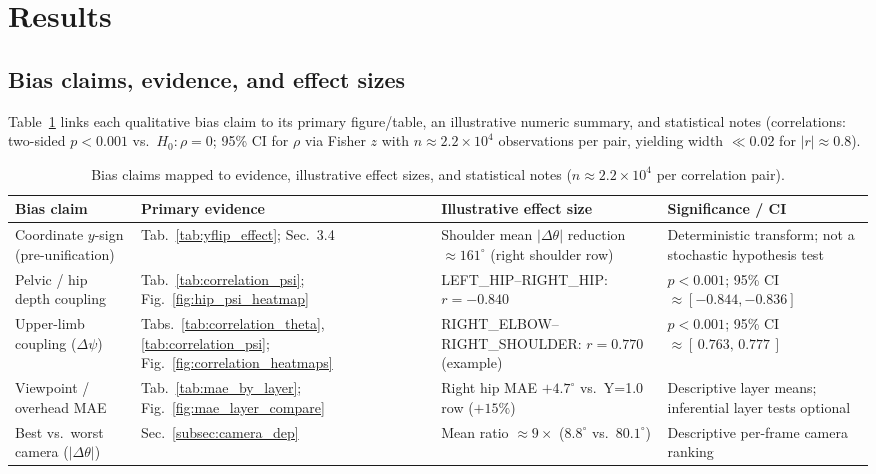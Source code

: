 \documentclass[twocolumn]{article}
\begin{document}
\section{Results}

\subsection{Bias claims, evidence, and effect sizes}

Table~\ref{tab:bias_claim_evidence} links each qualitative bias claim to its
primary figure/table, an illustrative numeric summary, and statistical notes
(correlations: two-sided $p<0.001$ vs.\ $H_0\!:\rho=0$; 95\% CI for $\rho$ via
Fisher $z$ with $n\approx 2.2\times 10^{4}$ observations per pair, yielding
width $\ll 0.02$ for $|r|\approx 0.8$).

\begin{table}[!t]
\centering
\caption{Bias claims mapped to evidence, illustrative effect sizes, and
  statistical notes ($n\approx 2.2\times 10^{4}$ per correlation pair).}
\label{tab:bias_claim_evidence}
\footnotesize
\begin{tabular}{p{} p{} p{} p{}}
\toprule
Bias claim & Primary evidence & Illustrative effect size & Significance / CI \\
\midrule
Coordinate $y$-sign (pre-unification) &
Tab.~\ref{tab:yflip_effect}; Sec.~3.4 &
Shoulder mean $|\Delta\theta|$ reduction
$\approx\!161^{\circ}$ (right shoulder row) &
Deterministic transform; not a stochastic hypothesis test \\
Pelvic / hip depth coupling &
Tab.~\ref{tab:correlation_psi}; Fig.~\ref{fig:hip_psi_heatmap} &
LEFT\_HIP--RIGHT\_HIP: $r=-0.840$ &
$p<0.001$; 95\% CI $\approx[-0.844,-0.836]$ \\
Upper-limb coupling ($\Delta\psi$) &
Tabs.~\ref{tab:correlation_theta}, \ref{tab:correlation_psi};
Fig.~\ref{fig:correlation_heatmaps} &
RIGHT\_ELBOW--RIGHT\_SHOULDER: $r=0.770$ (example) &
$p<0.001$; 95\% CI $\approx[\,0.763,\,0.777\,]$ \\
Viewpoint / overhead MAE &
Tab.~\ref{tab:mae_by_layer}; Fig.~\ref{fig:mae_layer_compare} &
Right hip MAE $+4.7^{\circ}$ vs.\ Y=1.0 row ($+15\%$) &
Descriptive layer means; inferential layer tests optional \\
Best vs.\ worst camera ($|\Delta\theta|$) &
Sec.~\ref{subsec:camera_dep} &
Mean ratio $\approx 9\times$ ($8.8^{\circ}$ vs.\ $80.1^{\circ}$) &
Descriptive per-frame camera ranking \\
\bottomrule
\end{tabular}
\end{table}
\end{document}
